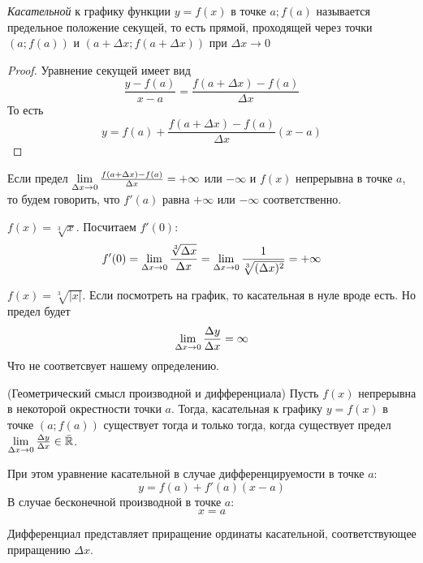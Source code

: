 \begin{definition}
	\textit{Касательной} к графику функции $y = f(x)$ в точке $a; f(a)$ называется предельное положение секущей, то есть прямой, проходящей через точки $(a; f(a))$ и $(a + \Delta x; f(a + \Delta x))$ при $\Delta x \to 0$
\end{definition}

\begin{proof}
	Уравнение секущей имеет вид
	$$
		\frac{y - f(a)}{x - a} = \frac{f(a + \Delta x) - f(a)}{\Delta x}
	$$
	То есть
	$$
		y = f(a) + \frac{f(a + \Delta x) - f(a)}{\Delta x} (x - a)
	$$
\end{proof}

\begin{definition}
	Если предел $\lim\limits_{\Delta x \to 0} \frac{f(a + \Delta x) - f(a)}{\Delta x} = +\infty$ или $-\infty$ и $f(x)$ непрерывна в точке $a$, то будем говорить, что $f'(a)$ равна $+\infty$ или $-\infty$ соответственно.
\end{definition}

\begin{example}
	$f(x) = \sqrt[3]{x}$. Посчитаем $f'(0)$:
	$$
		f'(0) = \lim\limits_{\Delta x \to 0} \frac{\sqrt[3]{\Delta x}}{\Delta x} = \lim\limits_{\Delta x \to 0} \frac{1}{\sqrt[3]{(\Delta x)^2}} = +\infty
	$$
\end{example}

\begin{example}
	$f(x) = \sqrt[3]{|x|}$. Если посмотреть на график, то касательная в нуле вроде есть. Но предел будет
	$$
		\lim\limits_{\Delta x \to 0} \frac{\Delta y}{\Delta x} = \infty
	$$
	Что не соответсвует нашему определению.
\end{example}

\begin{theorem} (Геометрический смысл производной и дифференциала)
	Пусть $f(x)$ непрерывна в некоторой окрестности точки $a$. Тогда, касательная к графику $y = f(x)$ в точке $(a; f(a))$ существует тогда и только тогда, когда существует предел $\lim\limits_{\Delta x \to 0} \frac{\Delta y}{\Delta x} \in \bar{\mathbb{R}}$. 
	
	При этом уравнение касательной в случае дифференцируемости в точке $a$:
	$$
		y = f(a) + f'(a)(x - a)
	$$
	В случае бесконечной производной в точке $a$:
	$$
		x = a
	$$
	
	Дифференциал представляет приращение ординаты касательной, соответствующее приращению $\Delta x$.
\end{theorem}

